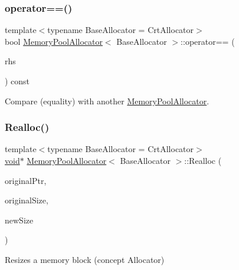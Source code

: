 \subsubsection{\texorpdfstring{operator==()}{operator==()}}
{\footnotesize\ttfamily template$<$typename Base\+Allocator = Crt\+Allocator$>$ \\
bool \hyperlink{classMemoryPoolAllocator}{Memory\+Pool\+Allocator}$<$ Base\+Allocator $>$\+::operator== (\begin{DoxyParamCaption}\item[{const \hyperlink{classMemoryPoolAllocator}{Memory\+Pool\+Allocator}$<$ Base\+Allocator $>$ \&}]{rhs }\end{DoxyParamCaption}) const\hspace{0.3cm}{\ttfamily [inline]}}



Compare (equality) with another \hyperlink{classMemoryPoolAllocator}{Memory\+Pool\+Allocator}. 

\mbox{\label{classMemoryPoolAllocator_aba75280d42184b0ad414243f7f5ac6c7}} 
\subsubsection{\texorpdfstring{Realloc()}{Realloc()}}
{\footnotesize\ttfamily template$<$typename Base\+Allocator = Crt\+Allocator$>$ \\
\hyperlink{imgui__impl__opengl3__loader_8h_ac668e7cffd9e2e9cfee428b9b2f34fa7}{void}$\ast$ \hyperlink{classMemoryPoolAllocator}{Memory\+Pool\+Allocator}$<$ Base\+Allocator $>$\+::Realloc (\begin{DoxyParamCaption}\item[{\hyperlink{imgui__impl__opengl3__loader_8h_ac668e7cffd9e2e9cfee428b9b2f34fa7}{void} $\ast$}]{original\+Ptr,  }\item[{size\+\_\+t}]{original\+Size,  }\item[{size\+\_\+t}]{new\+Size }\end{DoxyParamCaption})\hspace{0.3cm}{\ttfamily [inline]}}



Resizes a memory block (concept Allocator) 

\mbox{\label{classMemoryPoolAllocator_aee5e0b6d09dfbbc9bbbc59399a14cc53}} 
